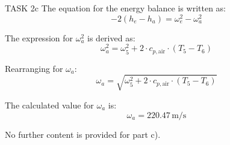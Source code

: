 TASK 2c  
The equation for the energy balance is written as:  
\[
-2 \left( h_e - h_a \right) = \omega_e^2 - \omega_a^2
\]  

The expression for \(\omega_a^2\) is derived as:  
\[
\omega_a^2 = \omega_5^2 + 2 \cdot c_{p,\text{air}} \cdot \left( T_5 - T_6 \right)
\]  

Rearranging for \(\omega_a\):  
\[
\omega_a = \sqrt{\omega_5^2 + 2 \cdot c_{p,\text{air}} \cdot \left( T_5 - T_6 \right)}
\]  

The calculated value for \(\omega_a\) is:  
\[
\omega_a = 220.47 \, \text{m/s}
\]  

No further content is provided for part c).